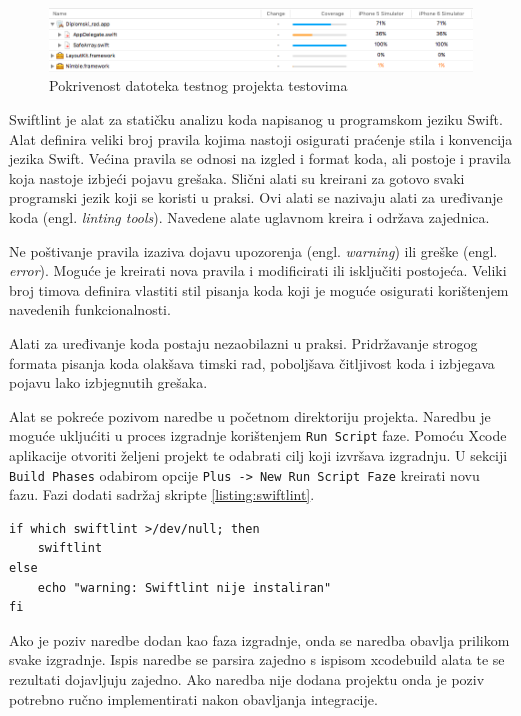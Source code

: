 \documentclass[times, utf8, diplomski, numeric]{fer}
\newcommand{\eng}[1]{(engl. \textit{#1})}
\begin{document}
\begin{figure}[h!]
\centering
\includegraphics[scale=0.45]{XcodeServerTestCoverage}
\caption{Pokrivenost datoteka testnog projekta testovima}
\label{fig:XcodeServerTestCoverage}
\end{figure}

Swiftlint je alat za statičku analizu koda napisanog u programskom jeziku Swift. Alat definira veliki broj pravila kojima nastoji osigurati praćenje stila i konvencija jezika Swift\citep{SwiftLint}. Većina pravila se odnosi na izgled i format koda, ali postoje i pravila koja nastoje izbjeći pojavu grešaka. Slični alati su kreirani za gotovo svaki programski jezik koji se koristi u praksi. Ovi alati se nazivaju alati za uređivanje koda \eng{linting tools}. Navedene alate uglavnom kreira i održava zajednica.

Ne poštivanje pravila izaziva dojavu upozorenja \eng{warning} ili greške \eng{error}. Moguće je kreirati nova pravila i modificirati ili isključiti postojeća. Veliki broj timova definira vlastiti stil pisanja koda koji je moguće osigurati korištenjem navedenih funkcionalnosti.

Alati za uređivanje koda postaju nezaobilazni u praksi. Pridržavanje strogog formata pisanja koda olakšava timski rad, poboljšava čitljivost koda i izbjegava pojavu lako izbjegnutih grešaka.

Alat se pokreće pozivom naredbe  u početnom direktoriju projekta. Naredbu je moguće ukljućiti u proces izgradnje korištenjem \verb|Run Script| faze. Pomoću Xcode aplikacije otvoriti željeni projekt te odabrati cilj koji izvršava izgradnju. U sekciji \verb|Build Phases| odabirom opcije \verb|Plus -> New Run Script Faze| kreirati novu fazu. Fazi dodati sadržaj skripte \ref{listing:swiftlint}.

\begin{lstlisting}[caption=Provjera postojanja i pokretanje Swiftlint alata, label=listing:swiftlint]
if which swiftlint >/dev/null; then
    swiftlint
else
    echo "warning: Swiftlint nije instaliran"
fi
\end{lstlisting}

Ako je poziv  naredbe dodan kao faza izgradnje, onda se naredba obavlja prilikom svake izgradnje. Ispis naredbe se parsira zajedno s ispisom xcodebuild alata te se rezultati dojavljuju zajedno. Ako naredba nije dodana projektu onda je poziv potrebno ručno implementirati nakon obavljanja integracije.
\end{document}
